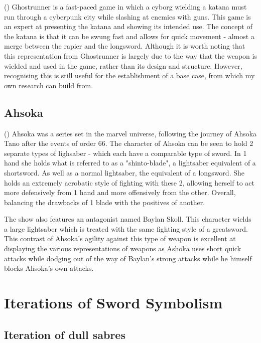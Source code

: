 \documentclass{article}
\begin{document}
()
Ghostrunner is a fast-paced game in which a cyborg wielding a katana must run through a cyberpunk city while slashing at enemies with guns. This game is an expert at presenting the katana and showing its intended use. The concept of the katana is that it can be swung fast and allows for quick movement - almost a merge between the rapier and the longsword. Although it is worth noting that this representation from Ghostrunner is largely due to the way that the weapon is wielded and used in the game, rather than its design and structure. However, recognising this is still useful for the establishment of a base case, from which my own research can build from.

\subsection{Ahsoka}

()
Ahsoka was a series set in the marvel universe, following the journey of Ahsoka Tano after the events of order 66. The character of Ahsoka can be seen to hold 2 separate types of lighsaber - which each have a comparable type of sword. In 1 hand she holds what is referred to as a "shinto-blade", a lightsaber equivalent of a shortsword. As well as a normal lightsaber, the equivalent of a longsword. She holds an extremely acrobatic style of fighting with these 2, allowing herself to act more defensively from 1 hand and more offensively from the other. Overall, balancing the drawbacks of 1 blade with the positives of another. 

The show also features an antagonist named Baylan Skoll. This character wields a large lightsaber which is treated with the same fighting style of a greatsword. This contrast of Ahsoka's agility against this type of weapon is excellent at displaying the various representations of weapons as Ashoka uses short quick attacks while dodging out of the way of Baylan's strong attacks while he himself blocks Ahsoka's own attacks.

\pagebreak

\section{Iterations of Sword Symbolism}

\subsection{Iteration of dull sabres} \label{Iteration1}
\end{document}
